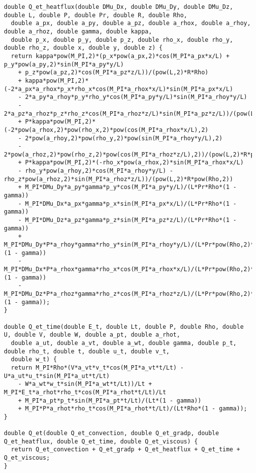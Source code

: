 \documentclass[10pt]{article}
\begin{document}
\begin{footnotesize}
\begin{verbatim}
double Q_et_heatflux(double DMu_Dx, double DMu_Dy, double DMu_Dz, double L, double P, double Pr, double R, double Rho, 
  double a_px, double a_py, double a_pz, double a_rhox, double a_rhoy, double a_rhoz, double gamma, double kappa, 
  double p_x, double p_y, double p_z, double rho_x, double rho_y, double rho_z, double x, double y, double z) {
  return kappa*pow(M_PI,2)*(p_x*pow(a_px,2)*cos(M_PI*a_px*x/L) + p_y*pow(a_py,2)*sin(M_PI*a_py*y/L) 
	+ p_z*pow(a_pz,2)*cos(M_PI*a_pz*z/L))/(pow(L,2)*R*Rho) 
	+ kappa*pow(M_PI,2)*(-2*a_px*a_rhox*p_x*rho_x*cos(M_PI*a_rhox*x/L)*sin(M_PI*a_px*x/L) 
	- 2*a_py*a_rhoy*p_y*rho_y*cos(M_PI*a_py*y/L)*sin(M_PI*a_rhoy*y/L) 
	- 2*a_pz*a_rhoz*p_z*rho_z*cos(M_PI*a_rhoz*z/L)*sin(M_PI*a_pz*z/L))/(pow(L,2)*R*pow(Rho,2)) 
	+ P*kappa*pow(M_PI,2)*(-2*pow(a_rhox,2)*pow(rho_x,2)*pow(cos(M_PI*a_rhox*x/L),2) 
	- 2*pow(a_rhoy,2)*pow(rho_y,2)*pow(sin(M_PI*a_rhoy*y/L),2) 
	- 2*pow(a_rhoz,2)*pow(rho_z,2)*pow(cos(M_PI*a_rhoz*z/L),2))/(pow(L,2)*R*pow(Rho,3)) 
	+ P*kappa*pow(M_PI,2)*(-rho_x*pow(a_rhox,2)*sin(M_PI*a_rhox*x/L) 
	- rho_y*pow(a_rhoy,2)*cos(M_PI*a_rhoy*y/L) - rho_z*pow(a_rhoz,2)*sin(M_PI*a_rhoz*z/L))/(pow(L,2)*R*pow(Rho,2)) 
	+ M_PI*DMu_Dy*a_py*gamma*p_y*cos(M_PI*a_py*y/L)/(L*Pr*Rho*(1 - gamma)) 
	- M_PI*DMu_Dx*a_px*gamma*p_x*sin(M_PI*a_px*x/L)/(L*Pr*Rho*(1 - gamma)) 
	- M_PI*DMu_Dz*a_pz*gamma*p_z*sin(M_PI*a_pz*z/L)/(L*Pr*Rho*(1 - gamma)) 
	+ M_PI*DMu_Dy*P*a_rhoy*gamma*rho_y*sin(M_PI*a_rhoy*y/L)/(L*Pr*pow(Rho,2)*(1 - gamma)) 
	- M_PI*DMu_Dx*P*a_rhox*gamma*rho_x*cos(M_PI*a_rhox*x/L)/(L*Pr*pow(Rho,2)*(1 - gamma)) 
	- M_PI*DMu_Dz*P*a_rhoz*gamma*rho_z*cos(M_PI*a_rhoz*z/L)/(L*Pr*pow(Rho,2)*(1 - gamma));
}

double Q_et_time(double E_t, double Lt, double P, double Rho, double U, double V, double W, double a_pt, double a_rhot, 
  double a_ut, double a_vt, double a_wt, double gamma, double p_t, double rho_t, double t, double u_t, double v_t, 
  double w_t) {
  return M_PI*Rho*(V*a_vt*v_t*cos(M_PI*a_vt*t/Lt) - U*a_ut*u_t*sin(M_PI*a_ut*t/Lt) 
	- W*a_wt*w_t*sin(M_PI*a_wt*t/Lt))/Lt + M_PI*E_t*a_rhot*rho_t*cos(M_PI*a_rhot*t/Lt)/Lt 
	+ M_PI*a_pt*p_t*sin(M_PI*a_pt*t/Lt)/(Lt*(1 - gamma)) 
	+ M_PI*P*a_rhot*rho_t*cos(M_PI*a_rhot*t/Lt)/(Lt*Rho*(1 - gamma));
}

double Q_et(double Q_et_convection, double Q_et_gradp, double Q_et_heatflux, double Q_et_time, double Q_et_viscous) {
  return Q_et_convection + Q_et_gradp + Q_et_heatflux + Q_et_time + Q_et_viscous;
}


\end{verbatim}
\end{footnotesize}
 

\end{document}

